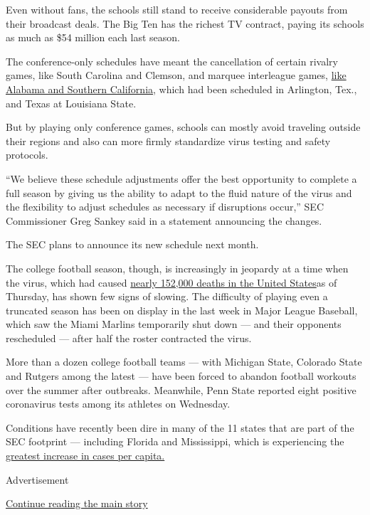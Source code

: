 Even without fans, the schools still stand to receive considerable
payouts from their broadcast deals. The Big Ten has the richest TV
contract, paying its schools as much as \$54 million each last season.

The conference-only schedules have meant the cancellation of certain
rivalry games, like South Carolina and Clemson, and marquee interleague
games,
\href{https://www.nytimes3xbfgragh.onion/2020/05/17/sports/ncaafootball/college-football-no-fans.html}{like
Alabama and Southern California}, which had been scheduled in Arlington,
Tex., and Texas at Louisiana State.

But by playing only conference games, schools can mostly avoid traveling
outside their regions and also can more firmly standardize virus testing
and safety protocols.

``We believe these schedule adjustments offer the best opportunity to
complete a full season by giving us the ability to adapt to the fluid
nature of the virus and the flexibility to adjust schedules as necessary
if disruptions occur,'' SEC Commissioner Greg Sankey said in a statement
announcing the changes.

The SEC plans to announce its new schedule next month.

The college football season, though, is increasingly in jeopardy at a
time when the virus, which had caused
\href{https://www.nytimes3xbfgragh.onion/interactive/2020/us/coronavirus-us-cases.html}{nearly
152,000 deaths in the United States}as of Thursday, has shown few signs
of slowing. The difficulty of playing even a truncated season has been
on display in the last week in Major League Baseball, which saw the
Miami Marlins temporarily shut down --- and their opponents rescheduled
--- after half the roster contracted the virus.

More than a dozen college football teams --- with Michigan State,
Colorado State and Rutgers among the latest --- have been forced to
abandon football workouts over the summer after outbreaks. Meanwhile,
Penn State reported eight positive coronavirus tests among its athletes
on Wednesday.

Conditions have recently been dire in many of the 11 states that are
part of the SEC footprint --- including Florida and Mississippi, which
is experiencing the
\href{https://www.nytimes3xbfgragh.onion/interactive/2020/us/coronavirus-us-cases.html}{greatest
increase in cases per capita.}

Advertisement

\protect\hyperlink{after-bottom}{Continue reading the main story}

